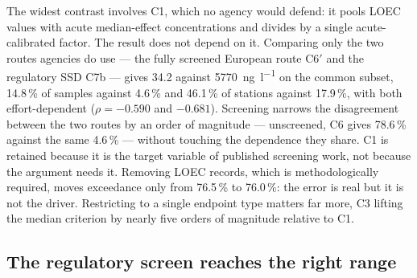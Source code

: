\documentclass[preprint,12pt]{elsarticle}
\begin{document}
The widest contrast involves C1, which no agency would defend: it pools
\textsf{LOEC} values with acute median-effect concentrations and divides by a
single acute-calibrated factor. The result does not depend on it. Comparing only
the two routes agencies do use --- the fully screened European route C6$'$ and
the regulatory SSD C7b --- gives \SI{34.2}{} against
\SI{5770}{\nano\gram\per\litre} on the common subset, 14.8\,\% of samples
against 4.6\,\% and 46.1\,\% of stations against 17.9\,\%, with both
effort-dependent ($\rho = -0.590$ and $-0.681$). Screening narrows the
disagreement between the two routes by an order of magnitude --- unscreened, C6
gives 78.6\,\% against the same 4.6\,\% --- without touching the dependence
they share. C1 is retained
because it is the target variable of published screening work, not because the
argument needs it. Removing \textsf{LOEC} records, which is methodologically
required, moves exceedance only from 76.5\,\% to 76.0\,\%: the error is real but
it is not the driver. Restricting to a single endpoint type matters far more, C3
lifting the median criterion by nearly five orders of magnitude relative to C1.





\subsection{The regulatory screen reaches the right range}
\end{document}
